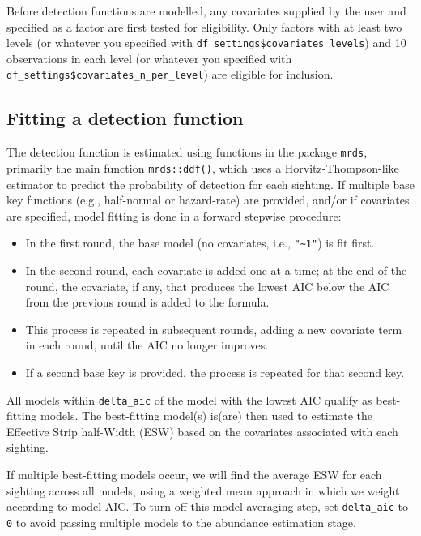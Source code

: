 \documentclass[
]{book}
\providecommand{\tightlist}{%
  \setlength{\itemsep}{0pt}\setlength{\parskip}{0pt}}
\begin{document}
Before detection functions are modelled, any covariates supplied by the user and specified as a factor are first tested for eligibility. Only factors with at least two levels (or whatever you specified with \texttt{df\_settings\$covariates\_levels}) and 10 observations in each level (or whatever you specified with \texttt{df\_settings\$covariates\_n\_per\_level}) are eligible for inclusion.

\hypertarget{fitting-a-detection-function}{%
\subsection*{Fitting a detection function}\label{fitting-a-detection-function}}

The detection function is estimated using functions in the package \texttt{mrds}, primarily the main function \texttt{mrds::ddf()}, which uses a Horvitz-Thompson-like estimator to predict the probability of detection for each sighting. If multiple base key functions (e.g., half-normal or hazard-rate) are provided, and/or if covariates are specified, model fitting is done in a forward stepwise procedure:

\begin{itemize}
\tightlist
\item
  In the first round, the base model (no covariates, i.e., \texttt{"\textasciitilde{}1"}) is fit first.\\
\item
  In the second round, each covariate is added one at a time; at the end of the round, the covariate, if any, that produces the lowest AIC below the AIC from the previous round is added to the formula.\\
\item
  This process is repeated in subsequent rounds, adding a new covariate term in each round, until the AIC no longer improves.
\item
  If a second base key is provided, the process is repeated for that second key.
\end{itemize}

All models within \texttt{delta\_aic} of the model with the lowest AIC qualify as best-fitting models. The best-fitting model(s) is(are) then used to estimate the Effective Strip half-Width (ESW) based on the covariates associated with each sighting.

If multiple best-fitting models occur, we will find the average ESW for each sighting across all models, using a weighted mean approach in which we weight according to model AIC. To turn off this model averaging step, set \texttt{delta\_aic} to \texttt{0} to avoid passing multiple models to the abundance estimation stage.
\end{document}
